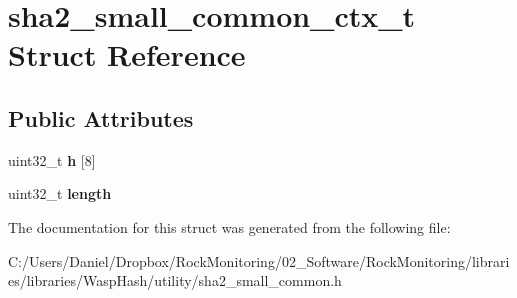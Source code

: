 \hypertarget{structsha2__small__common__ctx__t}{}\section{sha2\+\_\+small\+\_\+common\+\_\+ctx\+\_\+t Struct Reference}
\label{structsha2__small__common__ctx__t}
\subsection*{Public Attributes}
\begin{DoxyCompactItemize}
\item 
uint32\+\_\+t {\bfseries h} \mbox{[}8\mbox{]}\hypertarget{structsha2__small__common__ctx__t_a0245422307669515fbeb797fafa272a9}{}\label{structsha2__small__common__ctx__t_a0245422307669515fbeb797fafa272a9}

\item 
uint32\+\_\+t {\bfseries length}\hypertarget{structsha2__small__common__ctx__t_aa866ef6a2ab6cfe438eb41cc3828c9b8}{}\label{structsha2__small__common__ctx__t_aa866ef6a2ab6cfe438eb41cc3828c9b8}

\end{DoxyCompactItemize}


The documentation for this struct was generated from the following file\+:\begin{DoxyCompactItemize}
\item 
C\+:/\+Users/\+Daniel/\+Dropbox/\+Rock\+Monitoring/02\+\_\+\+Software/\+Rock\+Monitoring/libraries/libraries/\+Wasp\+Hash/utility/sha2\+\_\+small\+\_\+common.\+h\end{DoxyCompactItemize}
